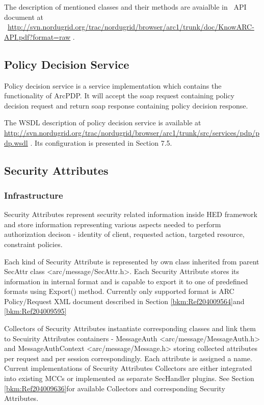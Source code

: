 \documentclass[a4paper]{article}
\begin{document}
{\upshape\color{black}
The description of mentioned classes and their methods are avaialble in
\ API document at
\ \url{http://svn.nordugrid.org/trac/nordugrid/browser/arc1/trunk/doc/KnowARC-API.pdf?format=raw}
.}

\subsection{Policy Decision Service}
{\upshape\color{black}
Policy decision service is a service implementation which contains the
functionality of ArcPDP. It will accept the soap request containing
policy decision request and return soap response containing policy
decision response.}

{\upshape\color{black}
The WSDL description of policy decision service is available at
\url{http://svn.nordugrid.org/trac/nordugrid/browser/arc1/trunk/src/services/pdp/pdp.wsdl}
. It{\textquotesingle}s configuration is presented in Section 7.5. }

\subsection{Security Attributes}
\subsubsection[Infrastructure]{Infrastructure}
\label{bkm:Ref204009818}{\upshape\color{black}
Security Attributes represent security related information inside HED
framework and store information representing various aspects needed to
perform authorization decison - identity of client, requested action,
targeted resource, constraint policies. }

{\upshape\color{black}
Each kind of Security Attribute is represented by own class inherited
from parent SecAttr class
{\textless}arc/message/SecAttr.h{\textgreater}. Each Security Attribute
stores it{\textquotesingle}s information in internal format and is
capable to export it to one of predefined formats using Export()
method. Currently only supported format is ARC Policy/Request XML
document described in Section \ref{bkm:Ref204009564}and
\ref{bkm:Ref204009595}}

{\upshape\color{black}
Collectors of Security Attributes instantiate corresponding classes and
link them to Secuirity Attributes containers - MessageAuth
{\textless}arc/message/MessageAuth.h{\textgreater} and
MessageAuthContext {\textless}arc/message/Message.h{\textgreater}
storing collected attributes per request and per session
correspondingly. Each attribute is assigned a name. Current
implementations of Security Attributes Collectors are either integrated
into existing MCCs or implemented as separate SecHandler plugins. See
Section \ref{bkm:Ref204009636}for available Collectors and
corresponding Security Attributes. }
\end{document}
